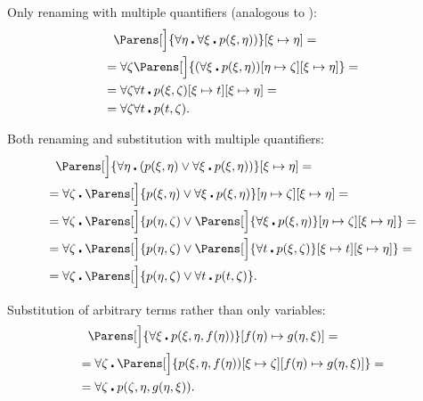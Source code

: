 \begin{example}
\begin{ExEnum}
     Only renaming with multiple quantifiers (analogous to ):
    \begin{align*}
      &{}\phantom{=}{}
      \Parens[\Big]{\forall \eta \centerdot \forall \xi \centerdot p(\xi, \eta))}[\xi \mapsto \eta]
      = \\ &=
      \forall \zeta \Parens[\Big]{(\forall \xi \centerdot p(\xi, \eta))[\eta \mapsto \zeta][\xi \mapsto \eta]}
      = \\ &=
      \forall \zeta \forall t \centerdot p(\xi, \zeta)[\xi \mapsto t][\xi \mapsto \eta]
      = \\ &=
      \forall \zeta \forall t \centerdot p(t, \zeta).
    \end{align*}

     Both renaming and substitution with multiple quantifiers:
    \begin{align*}
      &{}\phantom{=}{}
      \Parens[\Big]{ \forall \eta \centerdot (p(\xi, \eta) \vee \forall \xi \centerdot p(\xi, \eta)) }[\xi \mapsto \eta]
      = \\ &=
      \forall \zeta \centerdot \Parens[\Big]{ p(\xi, \eta) \vee \forall \xi \centerdot p(\xi, \eta) }[\eta \mapsto \zeta][\xi \mapsto \eta]
      = \\ &=
      \forall \zeta \centerdot \Parens[\Big]{ p(\eta, \zeta) \vee \Parens[\Big]{ \forall \xi \centerdot p(\xi, \eta) }[\eta \mapsto \zeta][\xi \mapsto \eta] }
      = \\ &=
      \forall \zeta \centerdot \Parens[\Big]{ p(\eta, \zeta) \vee \Parens[\Big]{ \forall t \centerdot p(\xi, \zeta) }[\xi \mapsto t][\xi \mapsto \eta] }
      = \\ &=
      \forall \zeta \centerdot \Parens[\Big]{ p(\eta, \zeta) \vee \forall t \centerdot p(t, \zeta) }.
    \end{align*}

     Substitution of arbitrary terms rather than only variables:
    \begin{align*}
      &{}\phantom{=}{}
      \Parens[\Big]{\forall \xi \centerdot p(\xi, \eta, f(\eta))}[f(\eta) \mapsto g(\eta, \xi)]
      = \\ &=
      \forall \zeta \centerdot \Parens[\Big]{p(\xi, \eta, f(\eta))[\xi \mapsto \zeta][f(\eta) \mapsto g(\eta, \xi)]}
      = \\ &=
      \forall \zeta \centerdot p(\zeta, \eta, g(\eta, \xi)).
    \end{align*}
  \end{ExEnum}
\end{example}

